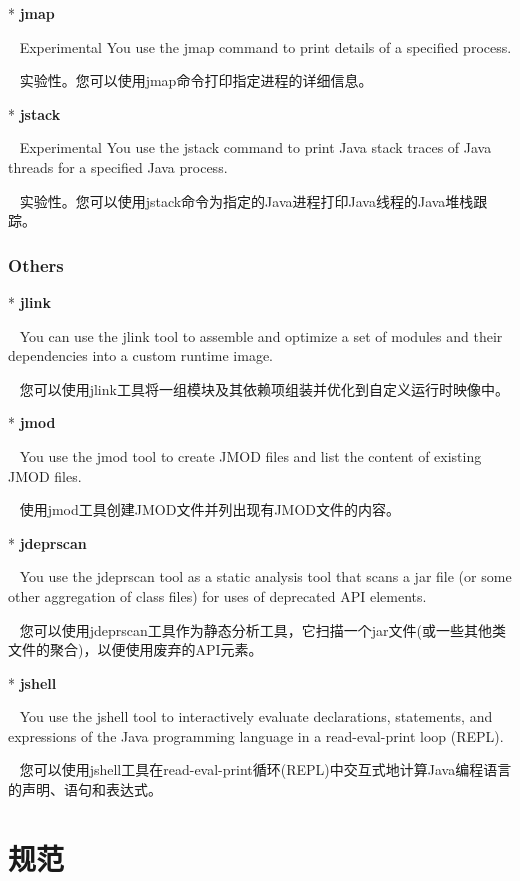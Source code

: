* \textbf{jmap}

~ Experimental You use the jmap command to print details of a specified process. 

~ 实验性。您可以使用jmap命令打印指定进程的详细信息。

* \textbf{jstack}

~ Experimental You use the jstack command to print Java stack traces of Java threads for a specified Java process. 

~ 实验性。您可以使用jstack命令为指定的Java进程打印Java线程的Java堆栈跟踪。\newline

\subsubsection{Others}

* \textbf{jlink}

~ You can use the jlink tool to assemble and optimize a set of modules and their dependencies into a custom runtime image.

~ 您可以使用jlink工具将一组模块及其依赖项组装并优化到自定义运行时映像中。

* \textbf{jmod}

~ You use the jmod tool to create JMOD files and list the content of existing JMOD files.

~ 使用jmod工具创建JMOD文件并列出现有JMOD文件的内容。

* \textbf{jdeprscan} 

~ You use the jdeprscan tool as a static analysis tool that scans a jar file (or some other aggregation of class files) for uses of deprecated API elements.

~ 您可以使用jdeprscan工具作为静态分析工具，它扫描一个jar文件(或一些其他类文件的聚合)，以便使用废弃的API元素。

* \textbf{jshell}

~ You use the jshell tool to interactively evaluate declarations, statements, and expressions of the Java programming language in a read-eval-print loop (REPL).

~ 您可以使用jshell工具在read-eval-print循环(REPL)中交互式地计算Java编程语言的声明、语句和表达式。




\section{规范}

